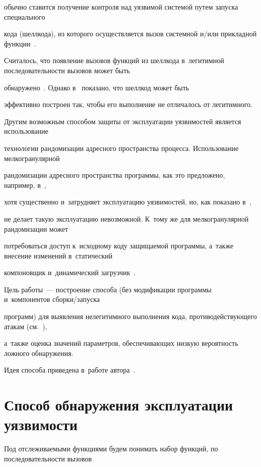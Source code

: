 обычно ставится получение контроля над уязвимой системой путем запуска специального 

кода (шеллкода), из которого осуществляется вызов системной и\!/\!или прикладной функции~\cite{Sno2013}. 

Считалось, что появление вызовов функций из шеллкода в~легитимной последовательности вызовов может быть 

обнаружено~\cite{Forrest2008}. Однако в~\cite{Wag2002} показано, что шеллкод может быть 

эффективно построен так, чтобы его выполнение не отличалось от легитимного.

 Другим возможным способом защиты от эксплуатации уязвимостей является использование 

 технологии рандомизации адресного пространства процесса. Использование мелкогранулярной 

 рандомизации адресного пространства программы, как это предложено, например, в~\cite{Nur2017}, 

 хотя существенно и~затрудняет эксплуатацию уязвимостей, но, как показано в~\cite{Sno2013}, 

 не делает такую эксплуатацию невозможной. К~тому же для мелкогранулярной рандомизации может 

 потребоваться доступ к~исходному коду защищаемой программы, а~также внесение изменений в~статический

  компоновщик и~динамический загрузчик~\cite{Nur2017}. 



Цель работы~--- построение способа (без модификации программы и~компонентов сбор\-ки\!/\!за\-пус\-ка 

программ) для выявления нелегитимного выполнения кода, противодействующего атакам (см.~\cite{Sno2013, Wag2002}), 

а~также оценка значений па\-ра\-мет\-ров, обеспечивающих низкую вероятность ложного обнаружения. 

Идея способа приведена в~работе автора~\cite{Kos2020}.



\section{Способ  обнаружения эксплуатации уязвимости}



Под отслеживаемыми функциями будем понимать набор функций, по последовательности вызовов 

